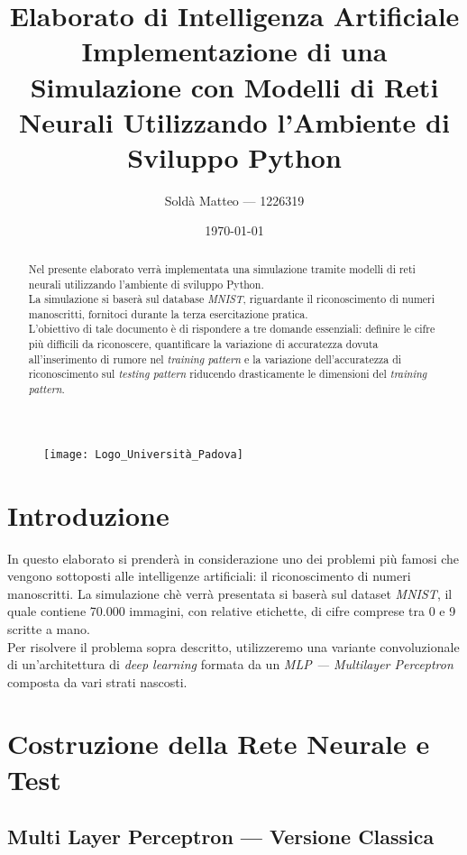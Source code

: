 \documentclass[12pt, a4paper]{article}
\title{\textbf{Elaborato di Intelligenza Artificiale} \\ Implementazione di una Simulazione con Modelli di Reti Neurali Utilizzando l'Ambiente di Sviluppo Python}
\author{Soldà Matteo --- 1226319}
\date{\today}
\begin{document}
\begin{figure}
    \centering
    \texttt{[image: Logo\_Università\_Padova]}
\end{figure}

\maketitle

\newpage
\begin{abstract}
Nel presente elaborato verrà implementata una simulazione tramite modelli di reti neurali utilizzando l'ambiente di sviluppo Python.\\
La simulazione si baserà sul database \textit{MNIST}, riguardante il riconoscimento di numeri manoscritti, fornitoci durante la terza esercitazione pratica.\\
L'obiettivo di tale documento è di rispondere a tre domande essenziali: definire le cifre più difficili da riconoscere, quantificare la variazione di accuratezza dovuta all'inserimento di rumore nel \textit{training pattern} e la variazione dell'accuratezza di riconoscimento sul \textit{testing pattern} riducendo drasticamente le dimensioni del \textit{training pattern}.    
\end{abstract}

\newpage
\tableofcontents

\newpage
\section{Introduzione}
In questo elaborato si prenderà in considerazione uno dei problemi più famosi che vengono sottoposti alle intelligenze artificiali: il riconoscimento di numeri manoscritti.
La simulazione chè verrà presentata si baserà sul dataset \textit{MNIST}, il quale contiene 70.000 immagini, con relative etichette, di cifre comprese tra 0 e 9 scritte a mano.\\
Per risolvere il problema sopra descritto, utilizzeremo una variante convoluzionale di un'architettura di \textit{deep learning} formata da un \textit{MLP --- Multilayer Perceptron} composta da vari strati nascosti.

\newpage
\section{Costruzione della Rete Neurale e Test}
\subsection{Multi Layer Perceptron --- Versione Classica}
\end{document}
